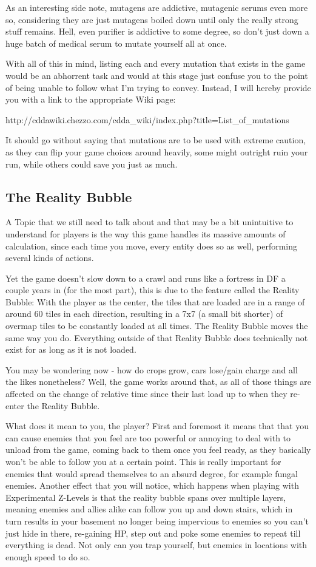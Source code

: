 \documentclass[11pt]{report}
\begin{document}
As an interesting side note, mutagens are addictive, mutagenic serums even more so, considering they are just mutagens boiled down until only the really strong stuff remains. Hell, even purifier is addictive to some degree, so don't just down a huge batch of medical serum to mutate yourself all at once.

With all of this in mind, listing each and every mutation that exists in the game would be an abhorrent task and would at this stage just confuse you to the point of being unable to follow what I'm trying to convey. Instead, I will hereby provide you with a link to the appropriate Wiki page:

http://cddawiki.chezzo.com/cdda\_wiki/index.php?title=List\_of\_mutations

It should go without saying that mutations are to be used with extreme caution, as they can flip your game choices around heavily, some might outright ruin your run, while others could save you just as much.

\subsection{The Reality Bubble}

A Topic that we still need to talk about and that may be a bit unintuitive to understand for players is the way this game handles its massive amounts of calculation, since each time you move, every entity does so as well, performing several kinds of actions.

Yet the game doesn't slow down to a crawl and runs like a fortress in DF a couple years in (for the most part), this is due to the feature called the Reality Bubble: With the player as the center, the tiles that are loaded are in a range of around 60 tiles in each direction, resulting in a 7x7 (a small bit shorter) of overmap tiles to be constantly loaded at all times. The Reality Bubble moves the same way you do. Everything outside of that Reality Bubble does technically not exist for as long as it is not loaded.

You may be wondering now - how do crops grow, cars lose/gain charge and all the likes nonetheless? Well, the game works around that, as all of those things are affected on the change of relative time since their last load up to when they re-enter the Reality Bubble.

What does it mean to you, the player? First and foremost it means that that you can cause enemies that you feel are too powerful or annoying to deal with to unload from the game, coming back to them once you feel ready, as they basically won't be able to follow you at a certain point. This is really important for enemies that would spread themselves to an absurd degree, for example fungal enemies. Another effect that you will notice, which happens when playing with Experimental Z-Levels is that the reality bubble spans over multiple layers, meaning enemies and allies alike can follow you up and down stairs, which in turn results in your basement no longer being impervious to enemies so you can't just hide in there, re-gaining HP, step out and poke some enemies to repeat till everything is dead. Not only can you trap yourself, but enemies in locations with enough speed to do so.
\end{document}
